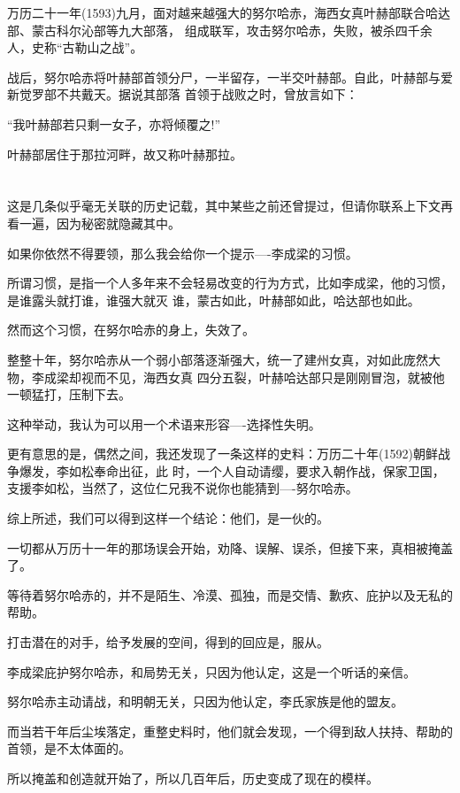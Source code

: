 \documentclass[11pt,a4paper,onecolumn]{article}
\begin{document}
万历二十一年(1593)九月，面对越来越强大的努尔哈赤，海西女真叶赫部联合哈达部、蒙古科尔沁部等九大部落，
组成联军，攻击努尔哈赤，失败，被杀四千余人，史称``古勒山之战''。

战后，努尔哈赤将叶赫部首领分尸，一半留存，一半交叶赫部。自此，叶赫部与爱新觉罗部不共戴天。据说其部落
首领于战败之时，曾放言如下：

``我叶赫部若只剩一女子，亦将倾覆之!''

叶赫部居住于那拉河畔，故又称叶赫那拉。

\section[\thesection]{}

这是几条似乎毫无关联的历史记载，其中某些之前还曾提过，但请你联系上下文再看一遍，因为秘密就隐藏其中。

如果你依然不得要领，那么我会给你一个提示----李成梁的习惯。

所谓习惯，是指一个人多年来不会轻易改变的行为方式，比如李成梁，他的习惯，是谁露头就打谁，谁强大就灭
谁，蒙古如此，叶赫部如此，哈达部也如此。

然而这个习惯，在努尔哈赤的身上，失效了。

整整十年，努尔哈赤从一个弱小部落逐渐强大，统一了建州女真，对如此庞然大物，李成梁却视而不见，海西女真
四分五裂，叶赫哈达部只是刚刚冒泡，就被他一顿猛打，压制下去。

这种举动，我认为可以用一个术语来形容----选择性失明。

更有意思的是，偶然之间，我还发现了一条这样的史料：万历二十年(1592)朝鲜战争爆发，李如松奉命出征，此
时，一个人自动请缨，要求入朝作战，保家卫国，支援李如松，当然了，这位仁兄我不说你也能猜到----努尔哈赤。

综上所述，我们可以得到这样一个结论：他们，是一伙的。

一切都从万历十一年的那场误会开始，劝降、误解、误杀，但接下来，真相被掩盖了。

等待着努尔哈赤的，并不是陌生、冷漠、孤独，而是交情、歉疚、庇护以及无私的帮助。

打击潜在的对手，给予发展的空间，得到的回应是，服从。

李成梁庇护努尔哈赤，和局势无关，只因为他认定，这是一个听话的亲信。

努尔哈赤主动请战，和明朝无关，只因为他认定，李氏家族是他的盟友。

而当若干年后尘埃落定，重整史料时，他们就会发现，一个得到敌人扶持、帮助的首领，是不太体面的。

所以掩盖和创造就开始了，所以几百年后，历史变成了现在的模样。
\end{document}
